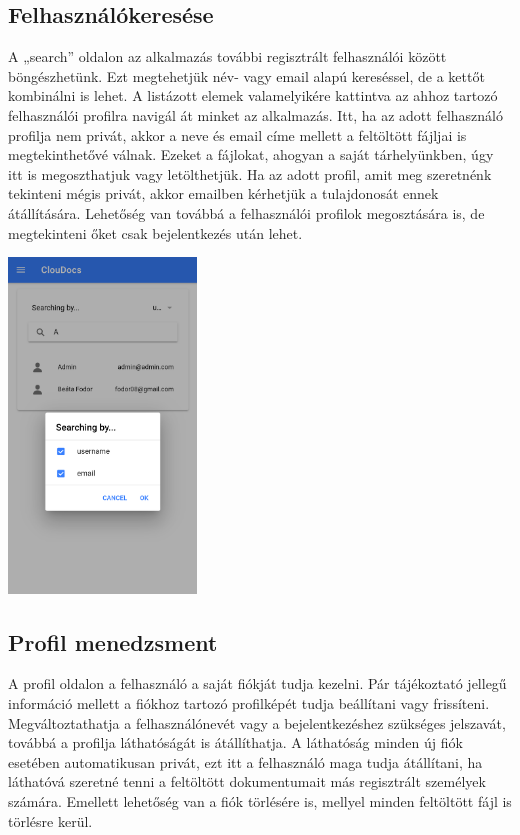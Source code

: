 \documentclass[12pt, twoside]{report}
\begin{document}
\subsection{Felhasználókeresése}
A „search” oldalon az alkalmazás további regisztrált felhasználói között böngészhetünk. Ezt megtehetjük név- vagy email alapú kereséssel, de a kettőt kombinálni is lehet. A listázott elemek valamelyikére kattintva az ahhoz tartozó felhasználói profilra navigál át minket az alkalmazás. Itt, ha az adott felhasználó profilja nem privát, akkor a neve és email címe mellett a feltöltött fájljai is megtekinthetővé válnak. Ezeket a fájlokat, ahogyan a saját tárhelyünkben, úgy itt is megoszthatjuk vagy letölthetjük. Ha az adott profil, amit meg szeretnénk tekinteni mégis privát, akkor emailben kérhetjük a tulajdonosát ennek átállítására. Lehetőség van továbbá a felhasználói profilok megosztására is, de megtekinteni őket csak bejelentkezés után lehet.

\begin{center}
	\includegraphics[width=50mm,scale=0.5,]{search.png}
\end{center}

\subsection{Profil menedzsment}
A profil oldalon a felhasználó a saját fiókját tudja kezelni. Pár tájékoztató jellegű információ mellett a fiókhoz tartozó profilképét tudja beállítani vagy frissíteni. Megváltoztathatja a felhasználónevét vagy a bejelentkezéshez szükséges jelszavát, továbbá a profilja láthatóságát is átállíthatja. A láthatóság minden új fiók esetében automatikusan privát, ezt itt a felhasználó maga tudja átállítani, ha láthatóvá szeretné tenni a feltöltött dokumentumait más regisztrált személyek számára. Emellett lehetőség van a fiók törlésére is, mellyel minden feltöltött fájl is törlésre kerül.
\end{document}
